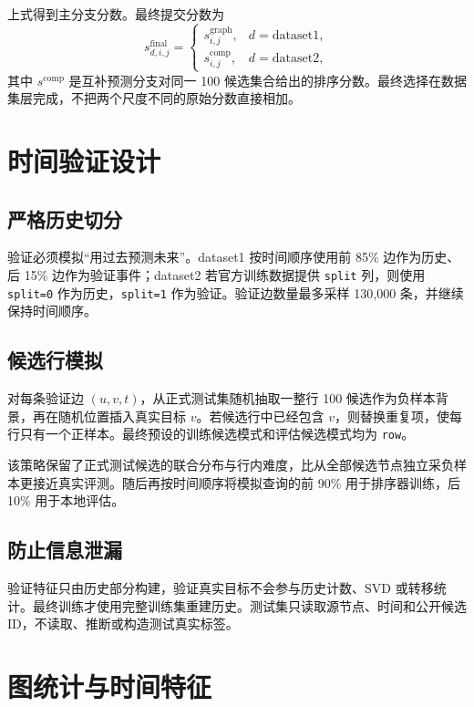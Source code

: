 \documentclass[UTF8,a4paper,11pt]{ctexart}
\begin{document}
上式得到主分支分数。最终提交分数为
\[
s^{\mathrm{final}}_{d,i,j}=
\begin{cases}
s^{\mathrm{graph}}_{i,j}, & d=\mathrm{dataset1},\\
s^{\mathrm{comp}}_{i,j}, & d=\mathrm{dataset2},
\end{cases}
\]
其中 $s^{\mathrm{comp}}$ 是互补预测分支对同一 100 候选集合给出的排序分数。最终选择在数据集层完成，不把两个尺度不同的原始分数直接相加。

\section{时间验证设计}

\subsection{严格历史切分}

验证必须模拟“用过去预测未来”。dataset1 按时间顺序使用前 85\% 边作为历史、后 15\% 边作为验证事件；dataset2 若官方训练数据提供 \texttt{split} 列，则使用 \texttt{split=0} 作为历史，\texttt{split=1} 作为验证。验证边数量最多采样 130,000 条，并继续保持时间顺序。

\subsection{候选行模拟}

对每条验证边 $(u,v,t)$，从正式测试集随机抽取一整行 100 候选作为负样本背景，再在随机位置插入真实目标 $v$。若候选行中已经包含 $v$，则替换重复项，使每行只有一个正样本。最终预设的训练候选模式和评估候选模式均为 \texttt{row}。

该策略保留了正式测试候选的联合分布与行内难度，比从全部候选节点独立采负样本更接近真实评测。随后再按时间顺序将模拟查询的前 90\% 用于排序器训练，后 10\% 用于本地评估。

\subsection{防止信息泄漏}

验证特征只由历史部分构建，验证真实目标不会参与历史计数、SVD 或转移统计。最终训练才使用完整训练集重建历史。测试集只读取源节点、时间和公开候选 ID，不读取、推断或构造测试真实标签。

\section{图统计与时间特征}
\end{document}
